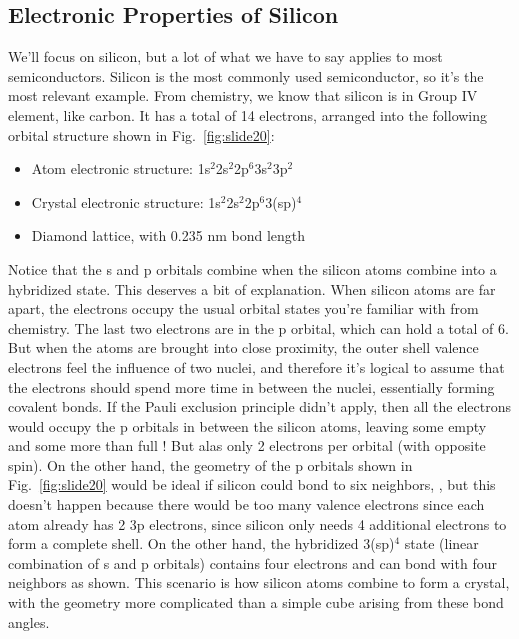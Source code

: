 \subsection{Electronic Properties of Silicon}
We'll focus on silicon, but a lot of what we have to say applies to most semiconductors.  Silicon is the most commonly used semiconductor, so it's the most relevant example.  From chemistry, we know that silicon is in Group IV element, like carbon.  It has a total of 14 electrons, arranged into the following orbital structure shown in Fig.~\ref{fig:slide20}:
    \begin{itemize}
        \item{Atom electronic structure: 1s$^2$2s$^2$2p$^6$3s$^2$3p$^2$}
        \item{Crystal electronic structure: 1s$^2$2s$^2$2p$^6$3(sp)$^4$}
        \item{Diamond lattice, with 0.235 nm bond length}
    \end{itemize}
Notice that the s and p orbitals combine when the silicon atoms combine into a hybridized state.  This deserves a bit of explanation.  When silicon atoms are far apart, the electrons occupy the usual orbital states you're familiar with from chemistry.  The last two electrons are in the p orbital, which can hold a total of 6.  But when the atoms are brought into close proximity, the outer shell valence electrons feel the influence of two nuclei, and therefore it's logical to assume that the electrons should spend more time in between the nuclei, essentially forming covalent bonds.  If the Pauli exclusion principle didn't apply, then all the electrons would occupy the p orbitals in between the silicon atoms, leaving some empty and some more than full !  But alas only 2 electrons per orbital (with opposite spin).
On the other hand, the geometry of the p orbitals shown in Fig.~\ref{fig:slide20} would be ideal if silicon could bond to six neighbors, , but this doesn't happen because there would be too many valence electrons since each atom already has 2 3p electrons, since silicon only needs 4 additional electrons to form a complete shell.  On the other hand, the hybridized 3(sp)$^4$ state (linear combination of s and p orbitals) contains four electrons and can bond with four neighbors as shown.  This scenario is how silicon atoms combine to form a crystal, with the geometry more complicated than a simple cube  arising from these bond angles.

